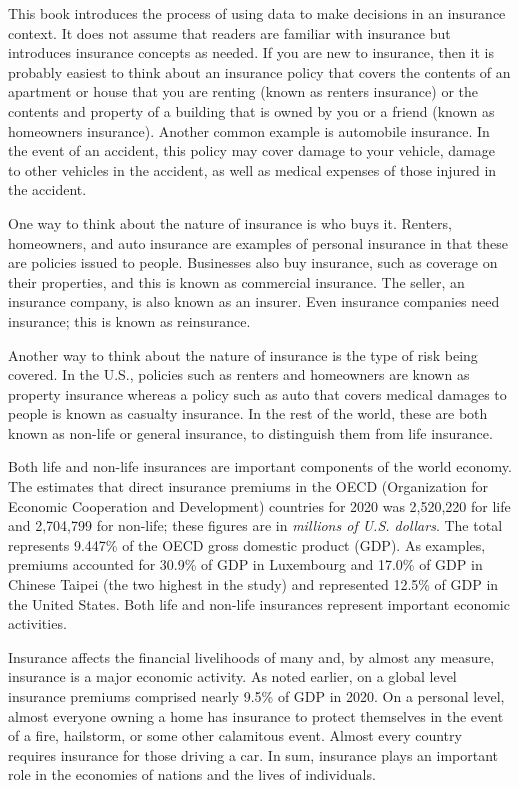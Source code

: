 \documentclass[
]{book}
\begin{document}
This book introduces the process of using data to make decisions in an insurance context. It does not assume that readers are familiar with
insurance but introduces insurance concepts as needed. If you are new to insurance, then it is probably easiest to think about an insurance policy that covers the contents of an apartment or house that you are renting (known as renters insurance) or the contents and property of a building that is owned by you or a friend (known as homeowners insurance). Another common example is automobile insurance. In the event of an accident, this policy may cover damage to your vehicle, damage to other vehicles in the accident, as well as medical expenses of those injured in the accident.

One way to think about the nature of insurance is who buys it. Renters, homeowners, and auto insurance are examples of personal insurance in that these are policies issued to people. Businesses also buy insurance, such as coverage on their properties, and this is known as commercial insurance. The seller, an insurance company, is also known as an insurer. Even insurance companies need insurance; this is known as reinsurance.

Another way to think about the nature of insurance is the type of risk being covered. In the U.S., policies such as renters and homeowners are known as
property insurance whereas a policy such as auto that covers medical damages to people is known as casualty insurance. In the rest of the world, these are both known as non-life or general insurance, to distinguish them from life insurance.

Both life and non-life insurances are important components of the world economy. The \citet{OECD2022} estimates that direct insurance premiums in the OECD (Organization for Economic Cooperation and Development) countries for 2020 was 2,520,220 for life and 2,704,799 for non-life; these figures are in \emph{millions of U.S. dollars}. The total represents 9.447\% of the OECD gross domestic product (GDP). As examples, premiums accounted for 30.9\% of GDP in Luxembourg and 17.0\% of GDP in Chinese Taipei (the two highest in the study) and represented 12.5\% of GDP in the United States. Both life and non-life insurances represent important economic activities.

Insurance affects the financial livelihoods of many and, by almost any measure, insurance is a major economic activity. As noted earlier, on a global level insurance premiums comprised nearly 9.5\% of GDP in 2020. On a personal level, almost everyone owning a home has insurance to protect themselves in the event of a fire, hailstorm, or some other calamitous event. Almost every country requires insurance for those driving a car. In sum, insurance plays an important role in the economies of nations and the lives of individuals.
\end{document}
